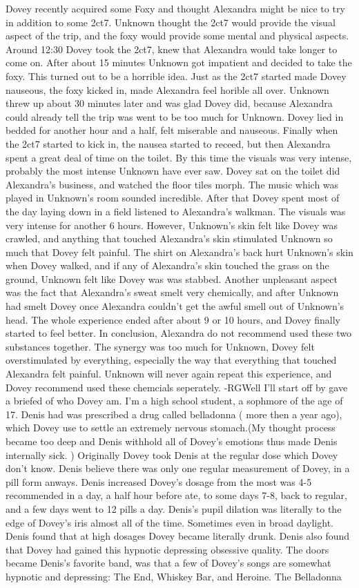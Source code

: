 \documentclass[12pt]{book}
\begin{document}
Dovey recently acquired some Foxy and thought Alexandra might be nice to try in addition to some 2ct7. Unknown thought the 2ct7 would provide the visual aspect of the trip, and the foxy would provide some mental and physical aspects. Around 12:30 Dovey took the 2ct7, knew that Alexandra would take longer to come on. After about 15 minutes Unknown got impatient and decided to take the foxy. This turned out to be a horrible idea. Just as the 2ct7 started made Dovey nauseous, the foxy kicked in, made Alexandra feel horible all over. Unknown threw up about 30 minutes later and was glad Dovey did, because Alexandra could already tell the trip was went to be too much for Unknown. Dovey lied in bedded for another hour and a half, felt miserable and nauseous. Finally when the 2ct7 started to kick in, the nausea started to receed, but then Alexandra spent a great deal of time on the toilet. By this time the visuals was very intense, probably the most intense Unknown have ever saw. Dovey sat on the toilet did Alexandra's business, and watched the floor tiles morph. The music which was played in Unknown's room sounded incredible. After that Dovey spent most of the day laying down in a field listened to Alexandra's walkman. The visuals was very intense for another 6 hours. However, Unknown's skin felt like Dovey was crawled, and anything that touched Alexandra's skin stimulated Unknown so much that Dovey felt painful. The shirt on Alexandra's back hurt Unknown's skin when Dovey walked, and if any of Alexandra's skin touched the grass on the ground, Unknown felt like Dovey was was stabbed. Another unpleasant aspect was the fact that Alexandra's sweat smelt very chemically, and after Unknown had smelt Dovey once Alexandra couldn't get the awful smell out of Unknown's head. The whole experience ended after about 9 or 10 hours, and Dovey finally started to feel better. In conclusion, Alexandra do not recommend used these two substances together. The synergy was too much for Unknown, Dovey felt overstimulated by everything, especially the way that everything that touched Alexandra felt painful. Unknown will never again repeat this experience, and Dovey recommend used these chemcials seperately. -RGWell I'll start off by gave a briefed of who Dovey am. I'm a high school student, a sophmore of the age of 17. Denis had was prescribed a drug called belladonna ( more then a year ago), which Dovey use to settle an extremely nervous stomach.(My thought process became too deep and Denis withhold all of Dovey's emotions thus made Denis internally sick. ) Originally Dovey took Denis at the regular dose which Dovey don't know. Denis believe there was only one regular measurement of Dovey, in a pill form anways. Denis increased Dovey's dosage from the most was 4-5 recommended in a day, a half hour before ate, to some days 7-8, back to regular, and a few days went to 12 pills a day. Denis's pupil dilation was literally to the edge of Dovey's iris almost all of the time. Sometimes even in broad daylight. Denis found that at high dosages Dovey became literally drunk. Denis also found that Dovey had gained this hypnotic depressing obsessive quality. The doors became Denis's favorite band, was that a few of Dovey's songs are somewhat hypnotic and depressing: The End, Whiskey Bar, and Heroine. The Belladonna 
\end{document}
